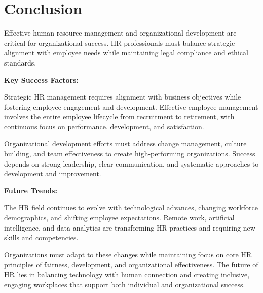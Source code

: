 \documentclass[12pt]{article}
\begin{document}
\section{Conclusion}

Effective human resource management and organizational development are critical for organizational success. HR professionals must balance strategic alignment with employee needs while maintaining legal compliance and ethical standards.

\textbf{Key Success Factors:}

Strategic HR management requires alignment with business objectives while fostering employee engagement and development. Effective employee management involves the entire employee lifecycle from recruitment to retirement, with continuous focus on performance, development, and satisfaction.

Organizational development efforts must address change management, culture building, and team effectiveness to create high-performing organizations. Success depends on strong leadership, clear communication, and systematic approaches to development and improvement.

\textbf{Future Trends:}

The HR field continues to evolve with technological advances, changing workforce demographics, and shifting employee expectations. Remote work, artificial intelligence, and data analytics are transforming HR practices and requiring new skills and competencies.

Organizations must adapt to these changes while maintaining focus on core HR principles of fairness, development, and organizational effectiveness. The future of HR lies in balancing technology with human connection and creating inclusive, engaging workplaces that support both individual and organizational success.
\end{document}
